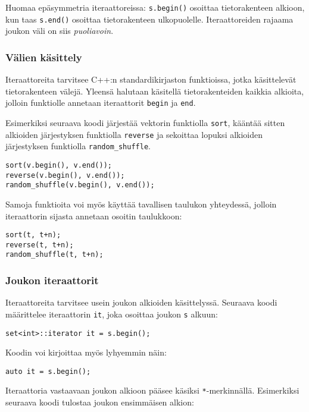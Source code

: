 Huomaa epäsymmetria iteraattoreissa:
\texttt{s.begin()} osoittaa tietorakenteen alkioon,
kun taas \texttt{s.end()} osoittaa tietorakenteen ulkopuolelle.
Iteraattoreiden rajaama joukon väli on siis \emph{puoliavoin}.

\subsubsection{Välien käsittely}

Iteraattoreita tarvitsee
C++:n standardikirjaston funktioissa, jotka käsittelevät
tietorakenteen välejä.
Yleensä halutaan käsitellä tietorakenteiden kaikkia
alkioita, jolloin funktiolle annetaan
iteraattorit \texttt{begin} ja \texttt{end}.

Esimerkiksi seuraava koodi järjestää vektorin funktiolla \texttt{sort},
kääntää sitten alkioiden järjestyksen funktiolla \texttt{reverse}
ja sekoittaa lopuksi alkioiden järjestyksen funktiolla \texttt{random\_shuffle}.


\begin{lstlisting}
sort(v.begin(), v.end());
reverse(v.begin(), v.end());
random_shuffle(v.begin(), v.end());
\end{lstlisting}

Samoja funktioita voi myös käyttää tavallisen taulukon
yhteydessä, jolloin iteraattorin sijasta annetaan
osoitin taulukkoon:

\begin{lstlisting}
sort(t, t+n);
reverse(t, t+n);
random_shuffle(t, t+n);
\end{lstlisting}

\subsubsection{Joukon iteraattorit}

Iteraattoreita tarvitsee usein joukon
alkioiden käsittelyssä.
Seuraava koodi määrittelee iteraattorin
\texttt{it}, joka osoittaa joukon \texttt{s} alkuun:
\begin{lstlisting}
set<int>::iterator it = s.begin();
\end{lstlisting}
Koodin voi kirjoittaa myös lyhyemmin näin:
\begin{lstlisting}
auto it = s.begin();
\end{lstlisting}
Iteraattoria vastaavaan joukon alkioon
pääsee käsiksi \texttt{*}-merkinnällä.
Esimerkiksi seuraava koodi tulostaa
joukon ensimmäisen alkion:

